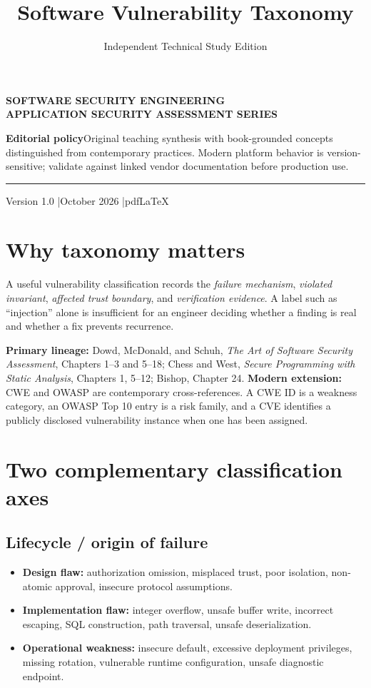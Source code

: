 \documentclass[
  letterpaper,
]{article}
\title{Software Vulnerability Taxonomy}
\author{Independent Technical Study Edition}
\date{}
\makeatletter
\providecommand{\tightlist}{%
  \setlength{\itemsep}{0pt}\setlength{\parskip}{0pt}}
\renewcommand{\maketitle}{%
 \hypersetup{pageanchor=false}%
\begin{titlepage}\thispagestyle{empty}
 \vspace*{1.5cm}{\color{brand}\rule{\textwidth}{3pt}}\par\vspace{1cm}
 {\sffamily\bfseries\color{muted}\large SOFTWARE SECURITY ENGINEERING\\ APPLICATION SECURITY ASSESSMENT SERIES}\par\vspace{1.05cm}
 {\sffamily\bfseries\color{ink}\fontsize{27}{34}\selectfont\@title\par}\vspace{0.8cm}
 {\sffamily\large\color{brand}\@author\par}\vfill
 \begin{tcolorbox}[colback=brandlight,colframe=brand!55,boxrule=0.5pt]
 \small\textbf{Editorial policy}\quad Original teaching synthesis with book-grounded concepts distinguished from contemporary practices. Modern platform behavior is version-sensitive; validate against linked vendor documentation before production use.
 \end{tcolorbox}
 {\color{brand}\rule{\textwidth}{2pt}}\par\vspace{0.3cm}
 {\sffamily\small Version 1.0 \quad|\quad October 2026 \quad|\quad pdfLaTeX}\end{titlepage}\hypersetup{pageanchor=true}\setcounter{page}{1}}
\makeatother
\begin{document}
\maketitle

{
\setcounter{tocdepth}{3}
\tableofcontents
}
\section{Why taxonomy matters}\label{why-taxonomy-matters}

A useful vulnerability classification records the \emph{failure
mechanism}, \emph{violated invariant}, \emph{affected trust boundary},
and \emph{verification evidence}. A label such as ``injection'' alone is
insufficient for an engineer deciding whether a finding is real and
whether a fix prevents recurrence.

\textbf{Primary lineage:} Dowd, McDonald, and Schuh, \emph{The Art of
Software Security Assessment}, Chapters 1--3 and 5--18; Chess and West,
\emph{Secure Programming with Static Analysis}, Chapters 1, 5--12;
Bishop, Chapter 24. \textbf{Modern extension:} CWE and OWASP are
contemporary cross-references. A CWE ID is a weakness category, an OWASP
Top 10 entry is a risk family, and a CVE identifies a publicly disclosed
vulnerability instance when one has been assigned.

\section{Two complementary classification
axes}\label{two-complementary-classification-axes}

\subsection{Lifecycle / origin of
failure}\label{lifecycle-origin-of-failure}

\begin{itemize}
\tightlist
\item
  \textbf{Design flaw:} authorization omission, misplaced trust, poor
  isolation, non-atomic approval, insecure protocol assumptions.
\item
  \textbf{Implementation flaw:} integer overflow, unsafe buffer write,
  incorrect escaping, SQL construction, path traversal, unsafe
  deserialization.
\item
  \textbf{Operational weakness:} insecure default, excessive deployment
  privileges, missing rotation, vulnerable runtime configuration, unsafe
  diagnostic endpoint.
\end{itemize}
\end{document}
